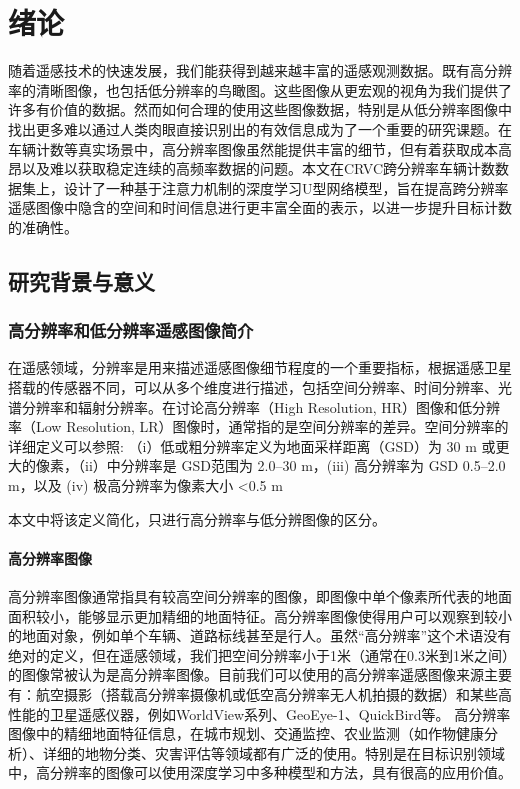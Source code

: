 
\chapter{绪论}
随着遥感技术的快速发展，我们能获得到越来越丰富的遥感观测数据。既有高分辨率的清晰图像，也包括低分辨率的鸟瞰图。这些图像从更宏观的视角为我们提供了许多有价值的数据。然而如何合理的使用这些图像数据，特别是从低分辨率图像中找出更多难以通过人类肉眼直接识别出的有效信息成为了一个重要的研究课题。在车辆计数等真实场景中，高分辨率图像虽然能提供丰富的细节，但有着获取成本高昂以及难以获取稳定连续的高频率数据的问题。本文在CRVC跨分辨率车辆计数数据集上，设计了一种基于注意力机制的深度学习U型网络模型，旨在提高跨分辨率遥感图像中隐含的空间和时间信息进行更丰富全面的表示，以进一步提升目标计数的准确性。
\section{研究背景与意义}
\subsection{高分辨率和低分辨率遥感图像简介}
在遥感领域，分辨率是用来描述遥感图像细节程度的一个重要指标，根据遥感卫星搭载的传感器不同，可以从多个维度进行描述，包括空间分辨率、时间分辨率、光谱分辨率和辐射分辨率。在讨论高分辨率（High Resolution, HR）图像和低分辨率（Low Resolution, LR）图像时，通常指的是空间分辨率的差异。空间分辨率的详细定义可以参照\cite{MultispectralImageAnalysisUsingObjectOrientedParadigm}:
（i）低或粗分辨率定义为地面采样距离（GSD）为 30 m 或更大的像素，（ii）中分辨率是 GSD范围为 2.0–30 m，(iii) 高分辨率为 GSD 0.5–2.0 m，以及 (iv) 极高分辨率为像素大小 <0.5 m

本文中将该定义简化，只进行高分辨率与低分辨图像的区分。
\subsubsection{高分辨率图像}
高分辨率图像通常指具有较高空间分辨率的图像，即图像中单个像素所代表的地面面积较小，能够显示更加精细的地面特征\cite{shimizu1983laser}。高分辨率图像使得用户可以观察到较小的地面对象，例如单个车辆、道路标线甚至是行人。虽然“高分辨率”这个术语没有绝对的定义，但在遥感领域，我们把空间分辨率小于1米（通常在0.3米到1米之间）的图像常被认为是高分辨率图像。目前我们可以使用的高分辨率遥感图像来源主要有：航空摄影（搭载高分辨率摄像机或低空高分辨率无人机拍摄的数据）和某些高性能的卫星遥感仪器，例如WorldView系列\cite{scitor2000project}、GeoEye-1、QuickBird等。
高分辨率图像中的精细地面特征信息，在城市规划、交通监控、农业监测（如作物健康分析）、详细的地物分类、灾害评估等领域都有广泛的使用。特别是在目标识别领域中，高分辨率的图像可以使用深度学习中多种模型和方法，具有很高的应用价值。


